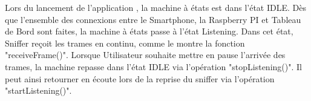 \newline
Lors du lancement de l'application {\nomApplication}, la machine à états est dans l'état IDLE. Dès que l'ensemble des connexions entre le Smartphone, la Raspberry PI et Tableau de Bord sont faites, la machine à états passe à l'état Listening. Dans cet état, Sniffer reçoit les trames en continu, comme le montre la fonction "receiveFrame()". \newline
Lorsque Utilisateur souhaite mettre en pause l'arrivée des trames, la machine repasse dans l'état IDLE via l'opération "stopListening()". Il peut ainsi retourner en écoute lors de la reprise du sniffer via l'opération "startListening()". \newline 
